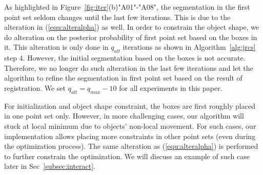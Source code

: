 As highlighted in Figure~\ref{fig:iter}(b)"A01"-"A08", the segmentation in the first point set seldom changes until the last few iterations. 
%
This is due to the alteration in (\ref{equ:alteralpha}) as well. 
%
In order to constrain the object shape, we do alteration on the posterior probability of first point set based on the boxes in it. This alteration is only done in $q_{alt}$ iterations as shown in Algorithm~\ref{alg:jrcs} step 4. 
However, the initial segmentation based on the boxes is not accurate. 
Therefore, we no longer do such alteration in the last few iterations and let the algorithm to refine the segmentation in first point set based on the result of registration. 
We set $q_{alt}=q_{max}-10$ for all experiments in this paper.

For initialization and object shape constraint, the boxes are first roughly placed in one point set only. 
However, in more challenging cases, our algorithm will stuck at local minimum due to objects' non-local movement. 
For such cases, our implementation allows placing more constraints in other point sets (even during the optimization process). 
The same alteration as (\ref{equ:alteralpha}) is performed to further constrain the optimization. We will discuss an example of such case later in Sec~\ref{subsec:interact}.